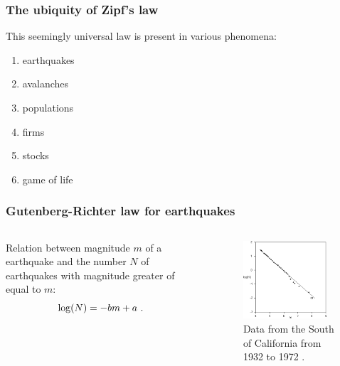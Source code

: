 \documentclass[notes]{beamer}
\begin{document}
\frame
{
  \frametitle{The ubiquity of Zipf's law}
  
  This seemingly universal law is present in various phenomena:
  \begin{enumerate}
  \item earthquakes 
  \item avalanches
  \item populations
  \item firms
  \item stocks
  \item game of life
  \end{enumerate}
}



\frame
{
  \frametitle{Gutenberg-Richter law for earthquakes}

  \begin{columns}[c]

  Relation between magnitude $m$ of a earthquake and the number $N$ of earthquakes with magnitude greater of equal to $m$:
  \begin{equation}
  \log(N) = -b m + a \textmd{ . }
  \end{equation}



  \vspace{-0.3cm}
  \begin{figure}[h!]
  \centering
  \includegraphics[width=0.9\textwidth]{images/GutenbergRichter.png}
  \caption{Data from the South of California from 1932 to 1972 \citep{turcotte}.}
  \label{fig:GutenbergRichter}
  \end{figure}

  \end{columns}
}
\end{document}
